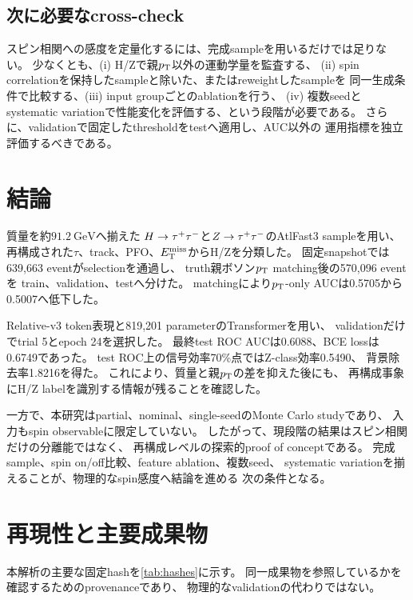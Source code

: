 \documentclass[xelatex,ja=standard,a4paper,10pt,twocolumn]{bxjsarticle}
\begin{document}
\subsection{次に必要なcross-check}

スピン相関への感度を定量化するには、完成sampleを用いるだけでは足りない。
少なくとも、(i) H/Zで親\(p_{\mathrm{T}}\)以外の運動学量を監査する、
(ii) spin correlationを保持したsampleと除いた、またはreweightしたsampleを
同一生成条件で比較する、(iii) input groupごとのablationを行う、
(iv) 複数seedとsystematic variationで性能変化を評価する、という段階が必要である。
さらに、validationで固定したthresholdをtestへ適用し、AUC以外の
運用指標を独立評価するべきである。

\section{結論}
\label{sec:conclusion}

質量を約\(\SI{91.2}{\GeV}\)へ揃えた
\(H\rightarrow\tau^{+}\tau^{-}\)と\(Z\rightarrow\tau^{+}\tau^{-}\)のAtlFast3 sampleを用い、
再構成された\(\tau\)、track、PFO、\(E_{\mathrm{T}}^{\mathrm{miss}}\)からH/Zを分類した。
固定snapshotでは639,663 eventがselectionを通過し、
truth親ボソン\(p_{\mathrm{T}}\) matching後の570,096 eventを
train、validation、testへ分けた。
matchingにより\(p_{\mathrm{T}}\)-only AUCは0.5705から0.5007へ低下した。

Relative-v3 token表現と819,201 parameterのTransformerを用い、
validationだけでtrial 5とepoch 24を選択した。
最終test ROC AUCは0.6088、BCE lossは0.6749であった。
test ROC上の信号効率70\%点ではZ-class効率0.5490、
背景除去率1.8216を得た。
これにより、質量と親\(p_{\mathrm{T}}\)の差を抑えた後にも、
再構成事象にH/Z labelを識別する情報が残ることを確認した。

一方で、本研究はpartial、nominal、single-seedのMonte Carlo studyであり、
入力もspin observableに限定していない。
したがって、現段階の結果はスピン相関だけの分離能ではなく、
再構成レベルの探索的proof of conceptである。
完成sample、spin on/off比較、feature ablation、複数seed、
systematic variationを揃えることが、物理的なspin感度へ結論を進める
次の条件となる。

\appendix

\section{再現性と主要成果物}
\label{app:reproducibility}

本解析の主要な固定hashを\cref{tab:hashes}に示す。
同一成果物を参照しているかを確認するためのprovenanceであり、
物理的なvalidationの代わりではない。
\end{document}
